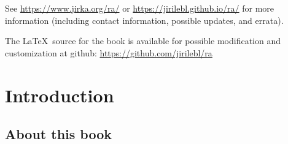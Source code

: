 \documentclass[12pt]{book}
\newcommand{\ignore}[1]{}
\theoremstyle{plain}
\theoremstyle{remark}
\theoremstyle{definition}
\theoremstyle{exercise}
\theoremstyle{example}
\begin{document}
\bigskip

\noindent
See \url{https://www.jirka.org/ra/} or \url{https://jirilebl.github.io/ra/} for more information
(including contact information, possible updates, and errata).


\bigskip

\noindent
The \LaTeX\ source for the book is available
for possible modification and customization
at github: \url{https://github.com/jirilebl/ra}



\tableofcontents
{}

\newpage


\chapter*{Introduction}


\section*{About this book}











\end{document}
